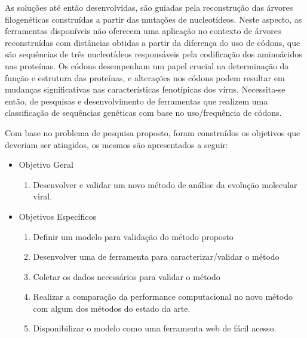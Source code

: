 As soluções até então desenvolvidas, são guiadas pela reconstrução das árvores filogenéticas construídas a partir das mutações de nucleotídeos. Neste aspecto, as ferramentas disponíveis não oferecem uma aplicação no contexto de árvores reconstruídas com distâncias obtidas a partir da diferença do uso de códons, que são sequências de três nucleotídeos responsáveis pela codificação dos aminoácidos nas proteínas. Os códons desempenham um papel crucial na determinação da função e estrutura das proteínas, e alterações nos códons podem resultar em mudanças significativas nas características fenotípicas dos vírus. Necessita-se então, de pesquisas e desenvolvimento de ferramentas que realizem uma classificação de sequências genéticas com base no uso/frequência de códons.


Com base no problema de pesquisa proposto, foram construídos os objetivos que deveriam ser atingidos, os mesmos são apresentados a seguir:
\begin{itemize}
  \item Objetivo Geral
        \begin{enumerate}[label=~(\roman*)]
          \item Desenvolver e validar um novo método de análise da evolução molecular viral.
        \end{enumerate}
  \item Objetivos Específicos
    \begin{enumerate}[label=~(\roman*)]
      \item Definir um modelo para validação do método proposto
      \item Desenvolver uma de ferramenta para caracterizar/validar o método
      \item Coletar os dados necessários para validar o método
      \item Realizar a comparação da performance computacional no novo método com algum dos métodos do estado da arte.
      \item Disponibilizar o modelo como uma ferramenta web de fácil acesso.
    \end{enumerate}
\end{itemize}


